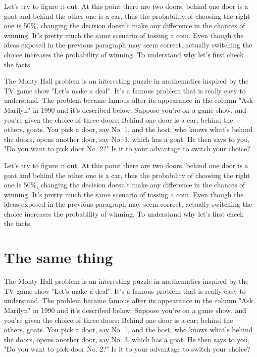 \documentclass[preprint]{oscmjournal}
\begin{document}
Let's try to figure it out. At this point there are two doors, behind one door is a goat  and behind the other one is a car, thus the probability of choosing the right one is 50\%, changing the decision doesn't make any difference in the chances of winning. It's pretty much the same scenario of tossing a coin. Even though the ideas exposed in the previous paragraph may seem correct, actually switching the choice increases the probability of winning. To understand why let's  first check the facts.

The Monty Hall problem is an interesting puzzle in mathematics inspired by the TV  game show "Let's make a deal". It's a famous problem that is really easy to understand. The problem became famous after its appearance in the column "Ask Marilyn" in 1990 and  it's described below: Suppose you're on a game show, and you're given the choice of three doors: Behind one  door is a car; behind the others, goats. You pick a door, say No. 1, and the host, who  knows what's behind the doors, opens another door, say No. 3, which has a goat. He then  says to you, "Do you want to pick door No. 2?" Is it to your advantage to switch your choice?

Let's try to figure it out. At this point there are two doors, behind one door is a goat  and behind the other one is a car, thus the probability of choosing the right one is 50\%, changing the decision doesn't make any difference in the chances of winning. It's pretty much the same scenario of tossing a coin. Even though the ideas exposed in the previous paragraph may seem correct, actually switching the choice increases the probability of winning. To understand why let's  first check the facts.


\section{The same thing}

The Monty Hall problem is an interesting puzzle in mathematics inspired by the TV  game show "Let's make a deal". It's a famous problem that is really easy to understand. The problem became famous after its appearance in the column "Ask Marilyn" in 1990 and  it's described below: Suppose you're on a game show, and you're given the choice of three doors: Behind one  door is a car; behind the others, goats. You pick a door, say No. 1, and the host, who  knows what's behind the doors, opens another door, say No. 3, which has a goat. He then  says to you, "Do you want to pick door No. 2?" Is it to your advantage to switch your choice?
\end{document}
